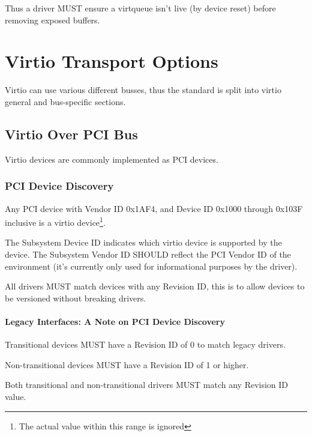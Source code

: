Thus a driver MUST ensure a virtqueue isn't live (by device reset) before removing exposed buffers.

\chapter{Virtio Transport Options}\label{sec:Virtio Transport Options}

Virtio can use various different busses, thus the standard is split
into virtio general and bus-specific sections.

\section{Virtio Over PCI Bus}\label{sec:Virtio Transport Options / Virtio Over PCI Bus}

Virtio devices are commonly implemented as PCI devices.

\subsection{PCI Device Discovery}\label{sec:Virtio Transport Options / Virtio Over PCI Bus / PCI Device Discovery}

Any PCI device with Vendor ID 0x1AF4, and Device ID 0x1000 through
0x103F inclusive is a virtio device\footnote{The actual value within this range is ignored
}.

The Subsystem Device ID indicates which virtio device is
supported by the device. The Subsystem Vendor ID SHOULD reflect
the PCI Vendor ID of the environment (it's currently only used
for informational purposes by the driver).

All drivers MUST match devices with any Revision ID, this
is to allow devices to be versioned without breaking drivers.

\subsubsection{Legacy Interfaces: A Note on PCI Device Discovery}\label{sec:Virtio Transport Options / Virtio Over PCI Bus / PCI Device Discovery / Legacy Interfaces: A Note on PCI Device Discovery}
Transitional devices MUST have a Revision ID of 0 to match
legacy drivers.

Non-transitional devices MUST have a Revision ID of 1 or higher.

Both transitional and non-transitional drivers MUST match
any Revision ID value.

